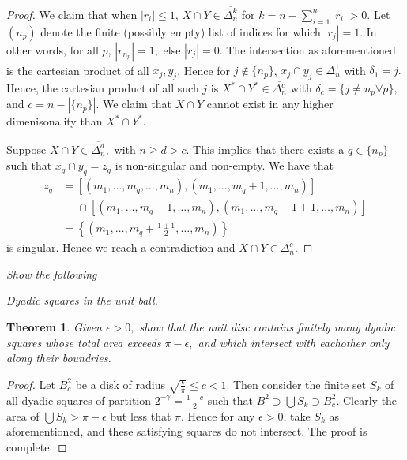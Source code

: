 \documentclass[letter]{article}
\newtheorem{theorem}{Theorem}
\newenvironment{menumerate}{%
  \edef\backupindent{\the\parindent}%
  \enumerate%
  \setlength{\parindent}{\backupindent}%
}{\endenumerate}
\begin{document}
\begin{menumerate}
\begin{menumerate}
\begin{proof}
					We claim that when $|r_i| \leq 1 $, $X \cap Y\in \overline{\Delta_n^k}$ for $k = n - \sum_{i=1}^n|r_i| > 0.$ Let $(n_p)$ denote the finite (possibly empty) list of indices for which $|r_j| = 1.$ In other words, for all $p$, $|r_{n_p}| = 1,$ else $|r_j| = 0.$ The intersection as aforementioned is the cartesian product of all $x_j, y_j$. Hence for $j \notin \{n_p\}$,  $x_j \cap y_j \in \overline{\Delta_n^1}$ with $\delta_1 = {j}.$ Hence, the cartesian product of all such $j$ is $X^* \cap Y^* \in \overline{\Delta_n^c}$ with $\delta_{c} = \{j \neq n_p \forall p\},$ and $c= n-|\{n_p\}|.$ We claim that $X \cap Y$ cannot exist in any higher dimenisonality than $X^* \cap Y^*.$ 

					Suppose $X \cap Y \in \overline{\Delta_n^d},$ with $n \geq d > c$.  This implies that there exists a $q \in \{n_p\}$ such that $x_q \cap y_q = z_q$ is non-singular and non-empty. We have that
					\begin{equation*}
						\begin{aligned}
							z_q &= [(m_1,\dots,m_q,\dots,m_n), (m_1,\dots,m_q+1,\dots,m_n)]\\
								&\;\;\;\;\; \cap  [(m_1,\dots,m_q \pm 1,\dots,m_n), (m_1,\dots,m_q+1 \pm 1,\dots,m_n)] \\
								&= \left\{\left(m_1,\dots,m_q+\frac{1\pm1}{2},\dots,m_n  \right)\right\}
						\end{aligned}
					\end{equation*}
					is singular. Hence we reach a contradiction and $X\cap Y \in \overline{\Delta_n^c}. $

 				\end{proof}
		\end{menumerate} 


		\item \textit{Show the following}
			\begin{menumerate}
			\item \textit{Dyadic squares in the unit ball.}
				\begin{theorem}
				Given $\epsilon > 0,$ show that the unit disc contains finitely many dyadic squares whose total area exceeds $\pi - \epsilon,$ and which intersect with eachother only along their boundries.
				\end{theorem}

				\begin{proof}
				     Let $B_c^2$ be a disk of radius $\sqrt{\frac{\epsilon}{\pi}} \leq c < 1$. Then consider the finite set $S_k$ of all dyadic squares of partition $2^{-\gamma} = \frac{1 - c}{2}$ such that $B^2 \supset \bigcup S_k \supset B_c^2$. Clearly the area of $\bigcup S_k > \pi - \epsilon$ but less that $\pi.$ Hence for any $\epsilon > 0$, take $S_k$ as aforementioned, and these satisfying squares do not intersect. The proof is complete.
				\end{proof}


\end{menumerate}
\end{menumerate}
\end{document}

